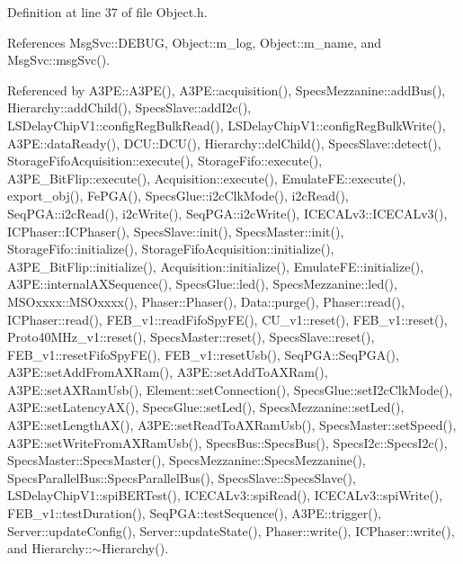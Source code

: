 Definition at line 37 of file Object.\+h.



References Msg\+Svc\+::\+D\+E\+B\+UG, Object\+::m\+\_\+log, Object\+::m\+\_\+name, and Msg\+Svc\+::msg\+Svc().



Referenced by A3\+P\+E\+::\+A3\+P\+E(), A3\+P\+E\+::acquisition(), Specs\+Mezzanine\+::add\+Bus(), Hierarchy\+::add\+Child(), Specs\+Slave\+::add\+I2c(), L\+S\+Delay\+Chip\+V1\+::config\+Reg\+Bulk\+Read(), L\+S\+Delay\+Chip\+V1\+::config\+Reg\+Bulk\+Write(), A3\+P\+E\+::data\+Ready(), D\+C\+U\+::\+D\+C\+U(), Hierarchy\+::del\+Child(), Specs\+Slave\+::detect(), Storage\+Fifo\+Acquisition\+::execute(), Storage\+Fifo\+::execute(), A3\+P\+E\+\_\+\+Bit\+Flip\+::execute(), Acquisition\+::execute(), Emulate\+F\+E\+::execute(), export\+\_\+obj(), Fe\+P\+G\+A(), Specs\+Glue\+::i2c\+Clk\+Mode(), i2c\+Read(), Seq\+P\+G\+A\+::i2c\+Read(), i2c\+Write(), Seq\+P\+G\+A\+::i2c\+Write(), I\+C\+E\+C\+A\+Lv3\+::\+I\+C\+E\+C\+A\+Lv3(), I\+C\+Phaser\+::\+I\+C\+Phaser(), Specs\+Slave\+::init(), Specs\+Master\+::init(), Storage\+Fifo\+::initialize(), Storage\+Fifo\+Acquisition\+::initialize(), A3\+P\+E\+\_\+\+Bit\+Flip\+::initialize(), Acquisition\+::initialize(), Emulate\+F\+E\+::initialize(), A3\+P\+E\+::internal\+A\+X\+Sequence(), Specs\+Glue\+::led(), Specs\+Mezzanine\+::led(), M\+S\+Oxxxx\+::\+M\+S\+Oxxxx(), Phaser\+::\+Phaser(), Data\+::purge(), Phaser\+::read(), I\+C\+Phaser\+::read(), F\+E\+B\+\_\+v1\+::read\+Fifo\+Spy\+F\+E(), C\+U\+\_\+v1\+::reset(), F\+E\+B\+\_\+v1\+::reset(), Proto40\+M\+Hz\+\_\+v1\+::reset(), Specs\+Master\+::reset(), Specs\+Slave\+::reset(), F\+E\+B\+\_\+v1\+::reset\+Fifo\+Spy\+F\+E(), F\+E\+B\+\_\+v1\+::reset\+Usb(), Seq\+P\+G\+A\+::\+Seq\+P\+G\+A(), A3\+P\+E\+::set\+Add\+From\+A\+X\+Ram(), A3\+P\+E\+::set\+Add\+To\+A\+X\+Ram(), A3\+P\+E\+::set\+A\+X\+Ram\+Usb(), Element\+::set\+Connection(), Specs\+Glue\+::set\+I2c\+Clk\+Mode(), A3\+P\+E\+::set\+Latency\+A\+X(), Specs\+Glue\+::set\+Led(), Specs\+Mezzanine\+::set\+Led(), A3\+P\+E\+::set\+Length\+A\+X(), A3\+P\+E\+::set\+Read\+To\+A\+X\+Ram\+Usb(), Specs\+Master\+::set\+Speed(), A3\+P\+E\+::set\+Write\+From\+A\+X\+Ram\+Usb(), Specs\+Bus\+::\+Specs\+Bus(), Specs\+I2c\+::\+Specs\+I2c(), Specs\+Master\+::\+Specs\+Master(), Specs\+Mezzanine\+::\+Specs\+Mezzanine(), Specs\+Parallel\+Bus\+::\+Specs\+Parallel\+Bus(), Specs\+Slave\+::\+Specs\+Slave(), L\+S\+Delay\+Chip\+V1\+::spi\+B\+E\+R\+Test(), I\+C\+E\+C\+A\+Lv3\+::spi\+Read(), I\+C\+E\+C\+A\+Lv3\+::spi\+Write(), F\+E\+B\+\_\+v1\+::test\+Duration(), Seq\+P\+G\+A\+::test\+Sequence(), A3\+P\+E\+::trigger(), Server\+::update\+Config(), Server\+::update\+State(), Phaser\+::write(), I\+C\+Phaser\+::write(), and Hierarchy\+::$\sim$\+Hierarchy().



